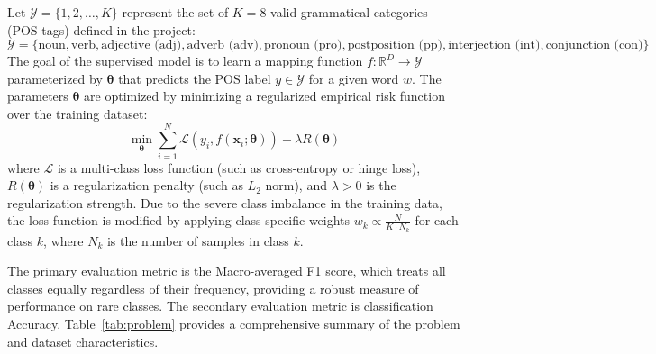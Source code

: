 \documentclass[12pt,a4paper]{article}
\begin{document}
Let $\mathcal{Y} = \{1, 2, \dots, K\}$ represent the set of $K = 8$ valid grammatical categories (POS tags) defined in the project:
\begin{equation}
  \mathcal{Y} = \{\text{noun}, \text{verb}, \text{adjective (adj)}, \text{adverb (adv)}, \text{pronoun (pro)}, \text{postposition (pp)}, \text{interjection (int)}, \text{conjunction (con)}\}
\end{equation}
The goal of the supervised model is to learn a mapping function $f: \mathbb{R}^D \rightarrow \mathcal{Y}$ parameterized by $\boldsymbol{\theta}$ that predicts the POS label $y \in \mathcal{Y}$ for a given word $w$. The parameters $\boldsymbol{\theta}$ are optimized by minimizing a regularized empirical risk function over the training dataset:
\begin{equation}
  \min_{\boldsymbol{\theta}} \sum_{i=1}^{N} \mathcal{L}(y_i, f(\mathbf{x}_i; \boldsymbol{\theta})) + \lambda R(\boldsymbol{\theta})
\end{equation}
where $\mathcal{L}$ is a multi-class loss function (such as cross-entropy or hinge loss), $R(\boldsymbol{\theta})$ is a regularization penalty (such as $L_2$ norm), and $\lambda > 0$ is the regularization strength. Due to the severe class imbalance in the training data, the loss function is modified by applying class-specific weights $w_k \propto \frac{N}{K \cdot N_k}$ for each class $k$, where $N_k$ is the number of samples in class $k$.

The primary evaluation metric is the Macro-averaged F1 score, which treats all classes equally regardless of their frequency, providing a robust measure of performance on rare classes. The secondary evaluation metric is classification Accuracy. Table~\ref{tab:problem} provides a comprehensive summary of the problem and dataset characteristics.
\end{document}
